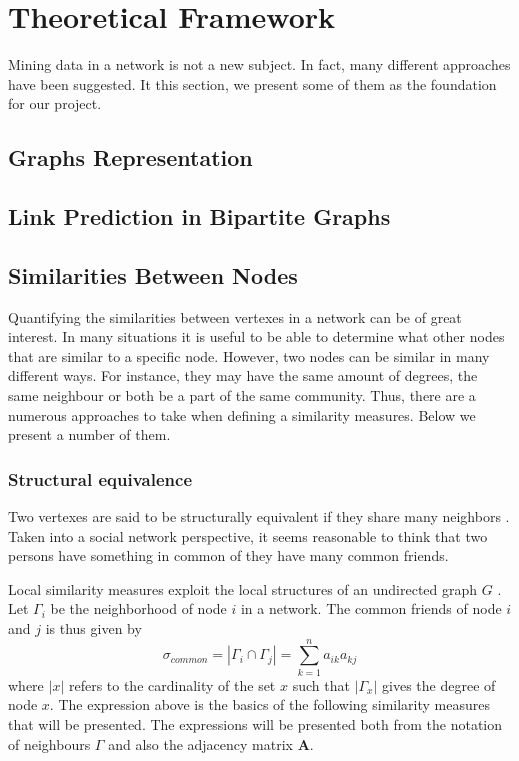 \chapter{Theoretical Framework}
Mining data in a network is not a new subject. In fact, many different approaches have been suggested. It this section, we present some of them as the foundation for our project.

\section{Graphs Representation}


\section{Link Prediction in Bipartite Graphs}


\section{Similarities Between Nodes \label{sim}}
Quantifying the similarities between vertexes in a network can be of great interest. In many situations it is useful to be able to determine what other nodes that are similar to a specific node. However, two nodes can be similar in many different ways. For instance, they may have the same amount of degrees, the same neighbour or both be a part of the same community. Thus, there are a numerous approaches to take when defining a similarity measures. Below we present a number of them. 

\subsection{Structural equivalence}
Two vertexes are said to be structurally equivalent if they share many neighbors \cite{leicht2006}. Taken into a social network perspective, it seems reasonable to think that two persons have something in common of they have many common friends. 

Local similarity measures exploit the local structures of an undirected graph $G$ \cite{fouss2016algorithms}. Let $\Gamma_i$ be the neighborhood of node $i$ in a network. The common friends of node $i$ and $j$ is thus given by
\begin{equation}
\label{common}
\sigma_{common} = |\Gamma_i \cap \Gamma_j| = \sum_{k=1}^n a_{ik}a_{kj}
\end{equation}
where $|x|$ refers to the cardinality of the set $x$ such that $|\Gamma_x |$ gives the degree of node $x$. The expression above is the basics of the following similarity measures that will be presented. The expressions will be presented both from the notation of neighbours $\Gamma$ and also the adjacency matrix $\textbf{A}$.

